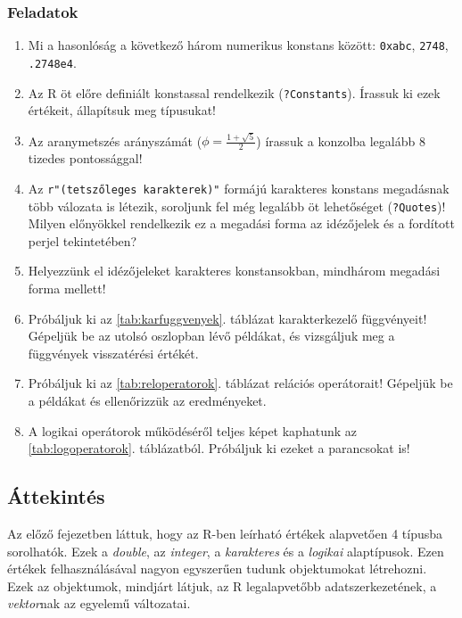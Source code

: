 \documentclass[
]{book}
\makeatletter
\providecommand{\tightlist}{%
  \setlength{\itemsep}{0pt}\setlength{\parskip}{0pt}}
\newenvironment{kframe}{%
\medskip{}
\setlength{\fboxsep}{.8em}
 \def\at@end@of@kframe{}%
 \ifinner\ifhmode%
  \def\at@end@of@kframe{\end{minipage}}%
  \begin{minipage}{\columnwidth}%
 \fi\fi%
 \def\FrameCommand##1{\hskip\@totalleftmargin \hskip-\fboxsep
 \colorbox{shadecolor}{##1}\hskip-\fboxsep
     \hskip-\linewidth \hskip-\@totalleftmargin \hskip\columnwidth}%
 \MakeFramed {\advance\hsize-\width
   \@totalleftmargin\z@ \linewidth\hsize
   \@setminipage}}%
 {\par\unskip\endMakeFramed%
 \at@end@of@kframe}
\newenvironment{rmdblock}[1]
  {
  \begin{itemize}
  \renewcommand{\labelitemi}{
    \raisebox{-.7\height}[0pt][0pt]{
      {\setkeys{Gin}{width=3em,keepaspectratio}\texttt{[image: images/\#1]}}
    }
  }
  \setlength{\fboxsep}{1em}
  \begin{kframe}
  \item
  }
  {
  \end{kframe}
  \end{itemize}
  }
\newenvironment{rmdexercise}
  {\begin{rmdblock}{exercise}}
  {\end{rmdblock}}
\makeatother
\begin{document}
\hypertarget{az-r-nyelv-3-1-exercise}{%
\subsubsection{Feladatok}\label{az-r-nyelv-3-1-exercise}}

\begin{rmdexercise}
\begin{enumerate}
\def\labelenumi{\arabic{enumi}.}
\tightlist
\item
  Mi a hasonlóság a következő három numerikus konstans között: \texttt{0xabc}, \texttt{2748}, \texttt{.2748e4}.
\item
  Az R öt előre definiált konstassal rendelkezik (\texttt{?Constants}). Írassuk ki ezek értékeit, állapítsuk meg típusukat!
\item
  Az aranymetszés arányszámát (\(\phi=\frac{1+\sqrt{5}}{2}\)) írassuk a konzolba legalább 8 tizedes pontossággal!
\item
  Az \texttt{r"(tetszőleges\ karakterek)"} formájú karakteres konstans megadásnak több válozata is létezik, soroljunk fel még legalább öt lehetőséget (\texttt{?Quotes})! Milyen előnyökkel rendelkezik ez a megadási forma az idézőjelek és a fordított perjel tekintetében?
\item
  Helyezzünk el idézőjeleket karakteres konstansokban, mindhárom megadási forma mellett!
\item
  Próbáljuk ki az \ref{tab:karfuggvenyek}. táblázat karakterkezelő függvényeit! Gépeljük be az utolsó oszlopban lévő példákat, és vizsgáljuk meg a függvények visszatérési értékét.
\item
  Próbáljuk ki az \ref{tab:reloperatorok}. táblázat relációs operátorait! Gépeljük be a példákat és ellenőrizzük az eredményeket.
\item
  A logikai operátorok működéséről teljes képet kaphatunk az \ref{tab:logoperatorok}. táblázatból. Próbáljuk ki ezeket a parancsokat is!
\end{enumerate}
\end{rmdexercise}

\hypertarget{uxe1ttekintuxe9s}{%
\subsection{Áttekintés}\label{uxe1ttekintuxe9s}}

Az előző fejezetben láttuk, hogy az R-ben leírható értékek alapvetően 4 típusba sorolhatók. Ezek a \emph{double}, az \emph{integer}, a \emph{karakteres} és a \emph{logikai} alaptípusok. Ezen értékek felhasználásával nagyon egyszerűen tudunk objektumokat létrehozni. Ezek az objektumok, mindjárt látjuk, az R legalapvetőbb adatszerkezetének, a \emph{vektor}nak az egyelemű változatai.
\end{document}
